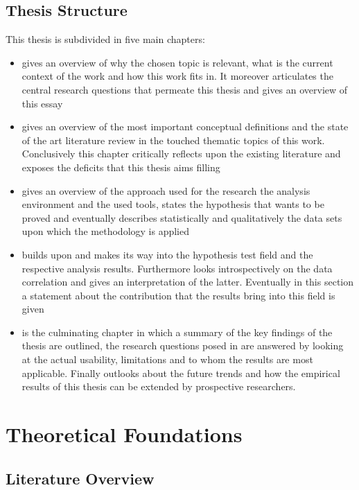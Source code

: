 \documentclass{seal_thesis}
\begin{document}
\section{Thesis Structure}

This thesis is subdivided in five main chapters:

\begin{itemize}
	\item {} gives an overview of why the chosen topic is relevant, what is the current context of the work and how this work fits in. It moreover articulates the central research questions that permeate this thesis and gives an overview of this essay
	\item {} gives an overview of the most important conceptual definitions and the state of the art literature review in the touched thematic topics of this work. Conclusively this chapter critically reflects upon the existing literature and exposes the deficits that this thesis aims filling
	\item {} gives an overview of the approach used for the research \eg the analysis environment and the used tools, states the hypothesis that wants to be proved and eventually describes statistically and qualitatively the data sets upon which the methodology is applied
	\item {} builds upon  and makes its way into the hypothesis test field and the respective analysis results. Furthermore looks introspectively on the data correlation and gives an interpretation of the latter. Eventually in this section a statement about the contribution that the results bring into this field is given
	\item {} is the culminating chapter in which a summary of the key findings of the thesis are outlined, the research questions posed in  are answered by looking at the actual usability, limitations and to whom the results are most applicable. Finally outlooks about the future trends and how the empirical results of this thesis can be extended by prospective researchers.
\end{itemize}

\chapter{Theoretical Foundations}
\label{ch:foundations}

\section{Literature Overview}
\label{sec:literature_overview}
\end{document}
